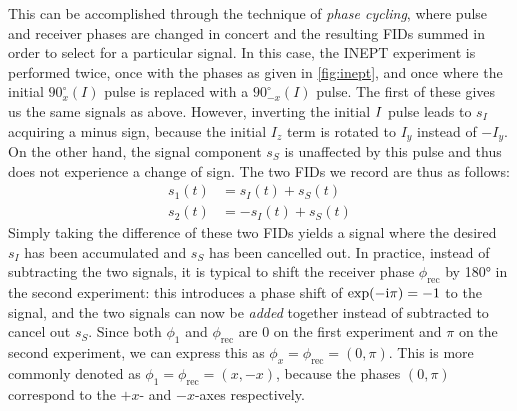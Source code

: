 This can be accomplished through the technique of \textit{phase cycling}, where pulse and receiver phases are changed in concert and the resulting FIDs summed in order to select for a particular signal.
In this case, the INEPT experiment is performed twice, once with the phases as given in \cref{fig:inept}, and once where the initial $90^\circ_x(I)$ pulse is replaced with a $90^\circ_{-x}(I)$ pulse.
The first of these gives us the same signals as above.
However, inverting the initial $I\/$ pulse leads to $s_I$ acquiring a minus sign, because the initial $I_z$ term is rotated to $I_y$ instead of $-I_y$.
On the other hand, the signal component $s_S$ is unaffected by this pulse and thus does not experience a change of sign.
The two FIDs we record are thus as follows:
\begin{align}
    \label{eq:inept_phase_cycling}
    s_1(t) &= s_I(t) + s_S(t) \\
    s_2(t) &= -s_I(t) + s_S(t)
\end{align}
Simply taking the difference of these two FIDs yields a signal where the desired $s_I$ has been accumulated and $s_S$ has been cancelled out.
In practice, instead of subtracting the two signals, it is typical to shift the receiver phase $\phi_\text{rec}$ by \ang{180} in the second experiment: this introduces a phase shift of $\exp(-\mathrm{i}\pi) = -1$ to the signal, and the two signals can now be \textit{added} together instead of subtracted to cancel out $s_S$.
Since both $\phi_1$ and $\phi_\text{rec}$ are $0$ on the first experiment and $\pi$ on the second experiment, we can express this as $\phi_x = \phi_\text{rec} = (0, \pi)$.
This is more commonly denoted as $\phi_1 = \phi_\text{rec} = (x, -x)$, because the phases $(0, \pi)$ correspond to the $+x$- and $-x$-axes respectively.

